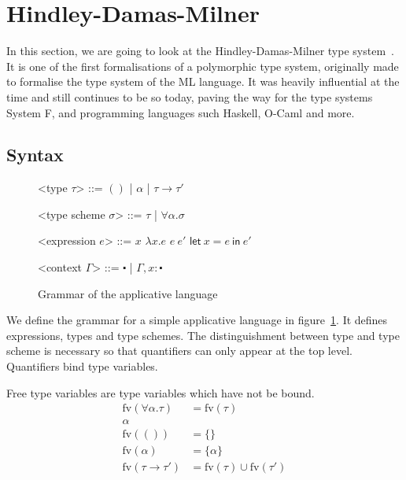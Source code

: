\section{Hindley-Damas-Milner}

In this section, we are going to look at the Hindley-Damas-Milner type
system~\cite{damas1982}. It is one of the first formalisations of a
polymorphic type system, originally made to formalise the type system
of the ML language. It was heavily influential at the time and still
continues to be so today, paving the way for the type systems System
F, and programming languages such Haskell, O-Caml and more.

\subsection{Syntax}

\def\defaultHypSeparation{\hskip .05in}
\newcommand{\letin}[2]{\mathsf{let} \ #1 \ \mathsf{in} \ #2}

\begin{figure}
  \begin{grammar}

    <type $\tau$> ::= $()$ | $\alpha$ | $\tau \rightarrow \tau'$
    
    <type scheme $\sigma$> ::= $\tau$ | $\forall \alpha . \sigma$

    <expression $e$> ::= $x$
    \alt $\lambda x . e$
    \alt $e \ e'$
    \alt $\mathsf{let} \ x = e \ \mathsf{in} \ e'$

    <context $\Gamma$> ::= $\centerdot$ | $\Gamma, x : \centerdot$

  \end{grammar}
  \caption{Grammar of the applicative language}\label{grm:applang}
\end{figure}

We define the grammar for a simple applicative language in
figure~\ref{grm:applang}.
It defines expressions, types and type schemes. The distinguishment
between type and type scheme is necessary so that quantifiers can only
appear at the top level. Quantifiers bind type variables.

Free type variables are type variables which have not be bound.
\begin{align*}
  \mathrm{fv}(\forall \alpha . \tau) &= \mathrm{fv}(\tau) \\ {\alpha} \\
  \mathrm{fv}(()) &= \{ \} \\
  \mathrm{fv}(\alpha) &= \{ \alpha \} \\
  \mathrm{fv}(\tau \rightarrow \tau') &= \mathrm{fv}(\tau) \cup \mathrm{fv}(\tau')
\end{align*}

